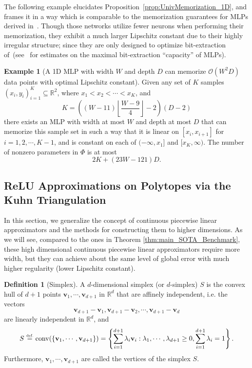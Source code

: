 \documentclass{article}
\numberwithin{equation}{section}
\theoremstyle{definition}
\newtheorem{definition}{Definition}[section]
\newtheorem{example}{Example}[section]
\newcommand{\eqdef}{\ensuremath{\stackrel{\mbox{\upshape\tiny def.}}{=}}}
\begin{document}
The following example elucidates Proposition~\ref{prop:UnivMemorization_1D}, and frames it in a way which is comparable to the memorization guarantees for MLPs derived in~\cite{vershynin2020memory,vardi2021optimal}.  Though those networks utilize fewer neurons when performing their memorization, they exhibit a much larger Lipschitz constant due to their highly irregular structure; since they are only designed to optimize bit-extraction of~\cite{telgarsky2016benefits,safran2017depth}(see~\cite{baldi2019capacity} for estimates on the maximal bit-extraction ``capacity'' of MLPs).
\begin{example}[A 1D MLP with width $W$ and depth $D$ can memorize $\mathcal{O}(W^2 D)$ data points with optimal Lipschitz constant]
\label{ex:1dMemorization}
Given any set of $K$ samples $(x_i,y_i)_{i=1}^{K}\subseteq\mathbb{R}^2$, where $x_1<x_2<\cdots<x_K$, and
\[
    K = 
    \left(
        (W-11) \left\lfloor \frac{W-9}{4} \right\rfloor - 2 
    \right)
    (D-2)
\]
there exists an MLP with width at most $W$ and depth at most $D$ that can memorize this sample set in such a way that it is linear on $[x_i,x_{i+1}]$ for $i=1,2,\cdots,K-1$, and is constant on each of $(-\infty,x_1]$ and $[x_K,\infty)$. The number of nonzero parameters in $\Phi$ is at most
\[
    2K + (23W-121)D .
\]
\end{example}


\subsection{ReLU Approximations on Polytopes via the Kuhn Triangulation}
\label{s:Compute__ssLKuhn}

In this section, we generalize the concept of continuous piecewise linear approximators and the methods for constructing them to higher dimensions. As we will see, compared to the ones in Theorem \ref{thm:main_SOTA_Benchmark}, these high dimensional continuous piecewise linear approximators require more width, but they can achieve about the same level of global error with much higher regularity (lower Lipschitz constant).

\begin{definition}[Simplex]
    A $d$-dimensional simplex (or $d$-simplex) $S$ is the convex hull of $d+1$ points $\mathbf{v}_1,\cdots,\mathbf{v}_{d+1}$ in $\mathbb{R}^d$ that are affinely independent, i.e. the vectors
    $$\mathbf{v}_{d+1}-\mathbf{v}_1,\mathbf{v}_{d+1}-\mathbf{v}_2,\cdots,\mathbf{v}_{d+1}-\mathbf{v}_d$$
    are linearly independent in $\mathbb{R}^d$, and
    $$S \eqdef 
    \operatorname{conv}(\{\mathbf{v}_1,\cdots,\mathbf{v}_{d+1}\})
    = \left\{
    \sum_{i=1}^{d+1} \lambda_i \mathbf{v}_i :
    \lambda_1,\cdots,\lambda_{d+1} \ge 0, \sum_{i=1}^{d+1} \lambda_i = 1
    \right\}.$$
    Furthermore, $\mathbf{v}_1,\cdots,\mathbf{v}_{d+1}$ are called the vertices of the simplex $S$.
\end{definition}
\end{document}
